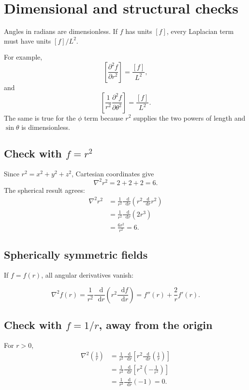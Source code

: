 \documentclass[11pt,a4paper]{article}
\newcommand{\dd}{\mathop{}\!\mathrm d}
\begin{document}
\clearpage

\section{Dimensional and structural checks}

Angles in radians are dimensionless. If \(f\) has units \([f]\), every Laplacian term must have units \([f]/L^2\).

For example,
\[
  \left[\frac{\partial^2f}{\partial r^2}\right]
  =\frac{[f]}{L^2},
\]
and
\[
  \left[
  \frac{1}{r^2}
  \frac{\partial^2f}{\partial\theta^2}
  \right]
  =\frac{[f]}{L^2}.
\]
The same is true for the \(\phi\) term because \(r^2\) supplies the two powers of length and \(\sin\theta\) is dimensionless.

\subsection{Check with \(f=r^2\)}

Since \(r^2=x^2+y^2+z^2\), Cartesian coordinates give
\[
  \nabla^2r^2=2+2+2=6.
\]
The spherical result agrees:
\begin{align*}
  \nabla^2r^2
  &=\frac{1}{r^2}\frac{\dd}{\dd r}
    \left(r^2\frac{\dd}{\dd r}r^2\right)\\
  &=\frac{1}{r^2}\frac{\dd}{\dd r}(2r^3)\\
  &=\frac{6r^2}{r^2}=6.
\end{align*}

\subsection{Spherically symmetric fields}

If \(f=f(r)\), all angular derivatives vanish:
\begin{result}
\[
  \boxed{
  \nabla^2f(r)
  =\frac{1}{r^2}\frac{\dd}{\dd r}
  \left(r^2\frac{\dd f}{\dd r}\right)
  =f''(r)+\frac{2}{r}f'(r).}
\]
\end{result}

\subsection{Check with \(f=1/r\), away from the origin}

For \(r>0\),
\begin{align*}
  \nabla^2\left(\frac1r\right)
  &=
  \frac{1}{r^2}\frac{\dd}{\dd r}
  \left[r^2\frac{\dd}{\dd r}\left(\frac1r\right)\right]\\
  &=
  \frac{1}{r^2}\frac{\dd}{\dd r}
  \left[r^2\left(-\frac1{r^2}\right)\right]\\
  &=\frac{1}{r^2}\frac{\dd}{\dd r}(-1)=0.
\end{align*}
\end{document}
